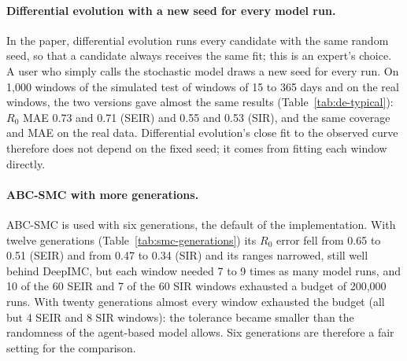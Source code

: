 \documentclass[12pt]{article}
\begin{document}
\paragraph{Differential evolution with a new seed for every model run.} In the paper, differential evolution
runs every candidate with the same random seed, so that a candidate always receives the same fit; this is an
expert's choice. A user who simply calls the stochastic model draws a new seed for every run. On 1,000 windows
of the simulated test of windows of 15 to 365 days and on the real windows, the two versions gave almost the same
results (Table~\ref{tab:de-typical}): $R_0$ MAE 0.73 and 0.71 (SEIR) and 0.55 and 0.53 (SIR), and the same
coverage and MAE on the real data. Differential evolution's close fit to the observed curve therefore does not
depend on the fixed seed; it comes from fitting each window directly.

\begin{table}[htbp]
\centering
\caption{Differential evolution as set up in the paper (one fixed random seed for every candidate) and as a
typical user would run it (a new random seed for every model run), with DeepIMC for reference: 1,000 windows of
the simulated test of windows of 15 to 365 days (500 per model), and the real windows.}
\label{tab:de-typical}
\small
\resizebox{\textwidth}{!}{}
\end{table}

\paragraph{ABC-SMC with more generations.} ABC-SMC is used with six generations, the default of the
implementation. With twelve generations (Table~\ref{tab:smc-generations}) its $R_0$ error fell from 0.65 to 0.51
(SEIR) and from 0.47 to 0.34 (SIR) and its ranges narrowed, still well behind DeepIMC, but each window needed 7 to 9
times as many model runs, and 10 of the 60 SEIR and 7 of the 60 SIR windows exhausted a budget of 200,000 runs.
With twenty generations almost every window exhausted the budget (all but 4 SEIR and 8 SIR windows): the tolerance
became smaller than the randomness of the agent-based model allows. Six generations are therefore a fair setting for the comparison.

\begin{table}[htbp]
\centering
\caption{ABC-SMC with 6 (as in the paper), 12 or 20 generations on 120 windows of the simulated test of windows of
15 to 365 days (60 per model; 20 early, middle and late), with a budget of 200,000 model runs: windows finished,
$R_0$ MAE, coverage and width of the 95\% range, model runs and seconds per window (means over the finished
windows; ``--'': fewer than 10 finished).}
\label{tab:smc-generations}
\small
\resizebox{\textwidth}{!}{}
\end{table}
\end{document}

